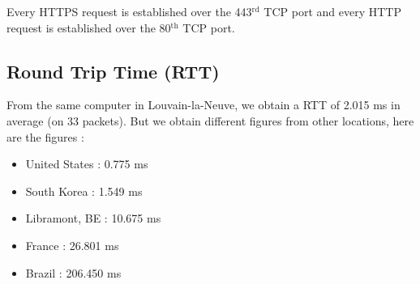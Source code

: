 \documentclass{article}
\begin{document}
Every HTTPS request is established over the 443$^{\text{rd}}$ TCP port and every HTTP request is established over the 80$^{\text{th}}$ TCP port.




\subsection{Round Trip Time (RTT)}
\label{sub:rtt}

From the same computer in Louvain-la-Neuve, we obtain a RTT of 2.015 ms in average (on 33 packets). But we obtain different figures from other locations, here are the figures : 
\begin{itemize}
    \itemsep-0.1em 
    \item United States :  0.775 ms
    \item South Korea : 1.549 ms
    \item Libramont, BE : 10.675 ms
    \item France : 26.801 ms
    \item Brazil : 206.450 ms
\end{itemize}


\end{document}
